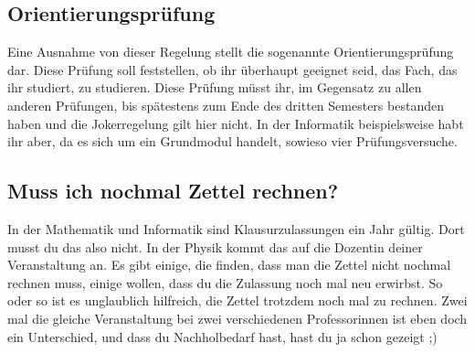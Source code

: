 \subsection{Orientierungsprüfung}
Eine Ausnahme von dieser Regelung stellt die sogenannte Orientierungsprüfung dar. Diese Prüfung soll feststellen, ob ihr überhaupt geeignet seid, das Fach, das ihr studiert, zu studieren. Diese Prüfung müsst ihr, im Gegensatz zu allen anderen Prüfungen, bis spätestens zum Ende des dritten Semesters bestanden haben und die Jokerregelung gilt hier nicht. In der Informatik beispielsweise habt ihr aber, da es sich um ein Grundmodul handelt, sowieso vier Prüfungsversuche.

\subsection{Muss ich nochmal Zettel rechnen?}
In der Mathematik und Informatik sind Klausurzulassungen ein Jahr gültig. Dort musst du das also nicht. In der Physik kommt das auf die Dozentin deiner Veranstaltung an. Es gibt einige, die finden, dass man die Zettel nicht nochmal rechnen muss, einige wollen, dass du die Zulassung noch mal neu erwirbst. So oder so ist es unglaublich hilfreich, die Zettel trotzdem noch mal zu rechnen. Zwei mal die gleiche Veranstaltung bei zwei verschiedenen Professorinnen ist eben doch ein Unterschied, und dass du Nachholbedarf hast, hast du ja schon gezeigt ;)
